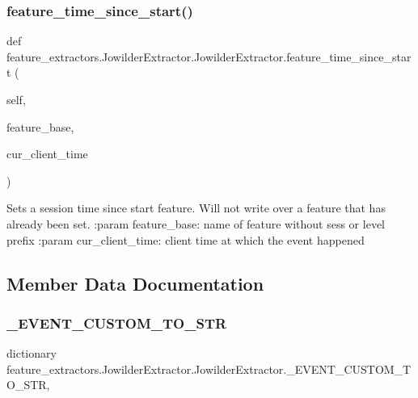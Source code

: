 \subsubsection{\texorpdfstring{feature\_time\_since\_start()}{feature\_time\_since\_start()}}
{\footnotesize\ttfamily def feature\+\_\+extractors.\+Jowilder\+Extractor.\+Jowilder\+Extractor.\+feature\+\_\+time\+\_\+since\+\_\+start (\begin{DoxyParamCaption}\item[{}]{self,  }\item[{}]{feature\+\_\+base,  }\item[{}]{cur\+\_\+client\+\_\+time }\end{DoxyParamCaption})}

\begin{DoxyVerb}Sets a session time since start feature. Will not write over a feature that has already been set.
:param feature_base: name of feature without sess or level prefix
:param cur_client_time: client time at which the event happened
\end{DoxyVerb}
 

\subsection{Member Data Documentation}
\mbox{\label{classfeature__extractors_1_1_jowilder_extractor_1_1_jowilder_extractor_a76384cc87ee00b3e884edc286b54588c}} 
\subsubsection{\texorpdfstring{\_EVENT\_CUSTOM\_TO\_STR}{\_EVENT\_CUSTOM\_TO\_STR}}
{\footnotesize\ttfamily dictionary feature\+\_\+extractors.\+Jowilder\+Extractor.\+Jowilder\+Extractor.\+\_\+\+E\+V\+E\+N\+T\+\_\+\+C\+U\+S\+T\+O\+M\+\_\+\+T\+O\+\_\+\+S\+TR\hspace{0.3cm}{\ttfamily [static]}, {\ttfamily [private]}}

